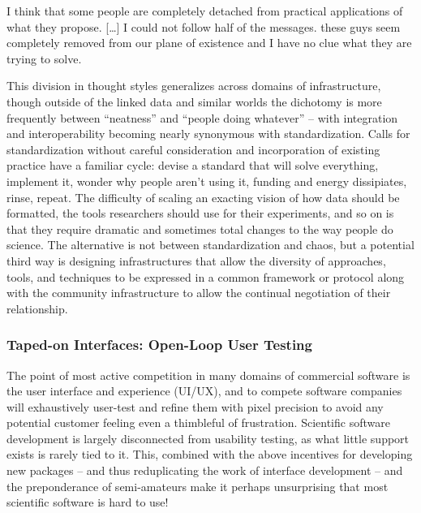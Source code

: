\documentclass[11pt]{article}
\begin{document}
\begin{multicols}{2}
\begin{leftbar}
I think that some people are completely detached from practical
applications of what they propose. {[}\ldots{]} I could not follow half
of the messages. these guys seem completely removed from our plane of
existence and I have no clue what they are trying to solve.
\end{leftbar}

This division in thought styles generalizes across domains of
infrastructure, though outside of the linked data and similar worlds the
dichotomy is more frequently between ``neatness'' and ``people doing
whatever'' -- with integration and interoperability becoming nearly
synonymous with standardization. Calls for standardization without
careful consideration and incorporation of existing practice have a
familiar cycle: devise a standard that will solve everything, implement
it, wonder why people aren't using it, funding and energy dissipiates,
rinse, repeat. The difficulty of scaling an exacting vision of how data
should be formatted, the tools researchers should use for their
experiments, and so on is that they require dramatic and sometimes total
changes to the way people do science. The alternative is not between
standardization and chaos, but a potential third way is designing
infrastructures that allow the diversity of approaches, tools, and
techniques to be expressed in a common framework or protocol along with
the community infrastructure to allow the continual negotiation of their
relationship.

\hypertarget{taped-on-interfaces-open-loop-user-testing}{%
\subsubsection{Taped-on Interfaces: Open-Loop User
Testing}\label{taped-on-interfaces-open-loop-user-testing}}

The point of most active competition in many domains of commercial
software is the user interface and experience (UI/UX), and to compete
software companies will exhaustively user-test and refine them with
pixel precision to avoid any potential customer feeling even a
thimbleful of frustration. Scientific software development is largely
disconnected from usability testing, as what little support exists is
rarely tied to it. This, combined with the above incentives for
developing new packages -- and thus reduplicating the work of interface
development -- and the preponderance of semi-amateurs make it perhaps
unsurprising that most scientific software is hard to use!


\end{multicols}
\end{document}
